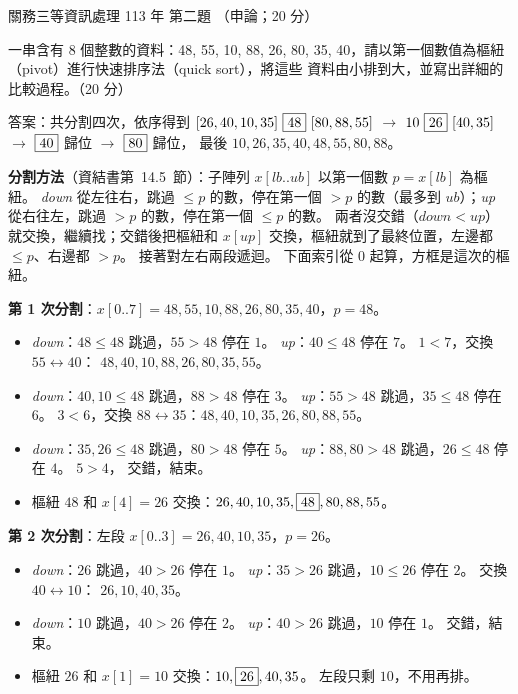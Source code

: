 \begin{pastexam}[label={px:gw3-113-ds-02}]{關務三等資訊處理 113 年 第二題}
（申論；20 分）

一串含有 8 個整數的資料：48, 55, 10, 88, 26, 80, 35, 40，請以第一個數值為樞紐（pivot）進行快速排序法（quick sort），將這些
資料由小排到大，並寫出詳細的比較過程。（20 分）
\end{pastexam}

\begin{pastsoln}
答案：共分割四次，依序得到
$[26, 40, 10, 35]\ \fbox{48}\ [80, 88, 55]$ $\to$ $10\ \fbox{26}\ [40, 35]$ $\to$ $\fbox{40}$ 歸位 $\to$ $\fbox{80}$ 歸位，
最後 $10, 26, 35, 40, 48, 55, 80, 88$。

\textbf{分割方法}（資結書第~14.5~節）：子陣列 $x[\mathit{lb}..\mathit{ub}]$ 以第一個數 $p = x[\mathit{lb}]$ 為樞紐。
\textit{down} 從左往右，跳過 $\le p$ 的數，停在第一個 $> p$ 的數（最多到 $\mathit{ub}$）；\textit{up} 從右往左，跳過 $> p$
的數，停在第一個 $\le p$ 的數。 兩者沒交錯（$\mathit{down} < \mathit{up}$）就交換，繼續找；交錯後把樞紐和 $x[\mathit{up}]$
交換，樞紐就到了最終位置，左邊都 $\le p$、右邊都 $> p$。 接著對左右兩段遞迴。 下面索引從 $0$ 起算，方框是這次的樞紐。

\textbf{第 1 次分割}：$x[0..7] = 48, 55, 10, 88, 26, 80, 35, 40$，$p = 48$。
\begin{itemize}
\item \textit{down}：$48 \le 48$ 跳過，$55 > 48$ 停在 $1$。 \textit{up}：$40 \le 48$ 停在 $7$。 $1 < 7$，交換 $55 \leftrightarrow 40$：
$48, 40, 10, 88, 26, 80, 35, 55$。
\item \textit{down}：$40, 10 \le 48$ 跳過，$88 > 48$ 停在 $3$。 \textit{up}：$55 > 48$ 跳過，$35 \le 48$ 停在 $6$。 $3 < 6$，交換
$88 \leftrightarrow 35$：$48, 40, 10, 35, 26, 80, 88, 55$。
\item \textit{down}：$35, 26 \le 48$ 跳過，$80 > 48$ 停在 $5$。 \textit{up}：$88, 80 > 48$ 跳過，$26 \le 48$ 停在 $4$。 $5 > 4$，
交錯，結束。
\item 樞紐 $48$ 和 $x[4] = 26$ 交換：$26, 40, 10, 35, \fbox{48}, 80, 88, 55$。
\end{itemize}

\textbf{第 2 次分割}：左段 $x[0..3] = 26, 40, 10, 35$，$p = 26$。
\begin{itemize}
\item \textit{down}：$26$ 跳過，$40 > 26$ 停在 $1$。 \textit{up}：$35 > 26$ 跳過，$10 \le 26$ 停在 $2$。 交換 $40 \leftrightarrow 10$：
$26, 10, 40, 35$。
\item \textit{down}：$10$ 跳過，$40 > 26$ 停在 $2$。 \textit{up}：$40 > 26$ 跳過，$10$ 停在 $1$。 交錯，結束。
\item 樞紐 $26$ 和 $x[1] = 10$ 交換：$10, \fbox{26}, 40, 35$。 左段只剩 $10$，不用再排。
\end{itemize}


\end{pastsoln}

